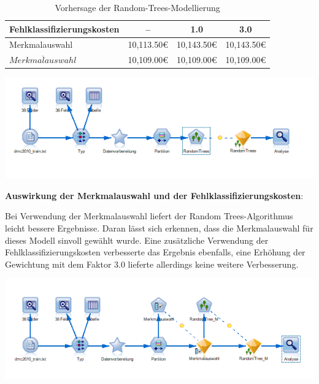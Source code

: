 \documentclass[a4paper,12pt]{article}
\newcounter{Algorithmus}
\begin{document}
\begin{table}[h]
\begin{center}
	\begin{tabular}{l | c | c | c}
	
	Fehlklassifizierungskosten & -- &  1.0 &  3.0
	\\
	\hline
	Merkmalauswahl  & 10,113.50\;\euro  & 10,143.50\;\euro & 10,143.50\;\euro
	\\
	$\overline{Merkmalauswahl}$  & 10,109.00\;\euro &  10,109.00\;\euro & 10,109.00\;\euro
	
\end{tabular}
\caption{Vorhersage der Random-Trees-Modellierung}
\end{center}
\end{table}

\begin{center}
\includegraphics[width=\textwidth]{Screens/random_trees}
\end{center}

{\bf Auswirkung der Merkmalauswahl und der Fehlklassifizierungskosten}:
\par
Bei Verwendung der Merkmalauswahl liefert der Random Trees-Algorithmus leicht bessere Ergebnisse.
Daran lässt sich erkennen, dass die Merkmalauswahl für dieses Modell sinvoll gewählt wurde.
Eine zusätzliche Verwendung der Fehlklassifizierungskosten verbesserte das Ergebnis ebenfalls, eine Erhöhung der Gewichtung mit dem Faktor 3.0 lieferte allerdings keine weitere Verbesserung.

\begin{center}
\includegraphics[width=\textwidth]{Screens/random_trees_m}
\end{center}
\end{document}

